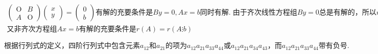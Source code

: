 
$\begin{array}{l}\begin{pmatrix}\mathrm O&B\\A&\mathrm O\end{pmatrix}\begin{pmatrix}x\\y\end{pmatrix}=\begin{pmatrix}0\\b\end{pmatrix}\mathrm{有解的充要条件是}By=0,Ax=b\mathrm{同时有解}.\;\mathrm{由于齐次线性方程组}By=0\mathrm{总是有解的}，\mathrm{所以}r\left(B\right)\mathrm{任意}；\\\mathrm{又非齐次方程组}Ax=b\mathrm{有解的充要条件是}r(A)=r(A\vdots b)\end{array}$


$\mathrm{根据行列式的定义}，\mathrm{四阶行列式中包含元素}a_{12}和a_{21}\mathrm{的项为}a_{12}a_{21}a_{33}a_{44}或a_{12}a_{21}a_{34}a_{43}，而a_{12}a_{21}a_{33}a_{44}\mathrm{带有负号}.$